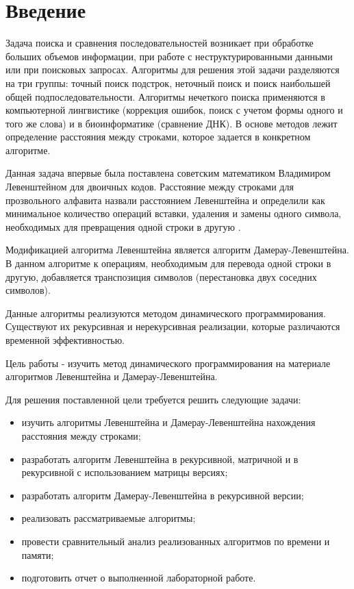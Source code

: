 \chapter*{Введение}

Задача поиска и сравнения последовательностей возникает при обработке больших объемов информации, при работе с неструктурированными данными или при поисковых запросах. Алгоритмы для решения этой задачи разделяются на три группы: точный поиск подстрок, неточный поиск и поиск наибольшей общей подпоследовательности. Алгоритмы нечеткого поиска применяются в компьютерной лингвистике (коррекция ошибок, поиск с учетом формы одного и того же слова) и в биоинформатике (сравнение ДНК). В основе методов лежит определение расстояния между строками, которое задается в конкретном алгоритме.

Данная задача впервые была поставлена советским математиком Владимиром Левенштейном для двоичных кодов. Расстояние между строками для прозвольного алфавита назвали расстоянием Левенштейна и определили как минимальное количество операций вставки, удаления и замены одного символа, необходимых для превращения одной строки в другую \cite{foxford}.

Модификацией алгоритма Левенштейна является алгоритм Дамерау-Левенштейна. В данном алгоритме к операциям, необходимым для перевода одной строки в другую, добавляется транспозиция символов (перестановка двух соседних символов).

Данные алгоритмы реализуются методом динамического программирования. Существуют их рекурсивная и нерекурсивная реализации, которые различаются временной эффективностью.

Цель работы - изучить метод динамического программирования на материале алгоритмов Левенштейна и Дамерау-Левенштейна.

Для решения поставленной цели требуется решить следующие задачи:

\begin{itemize}
	\item изучить алгоритмы Левенштейна и Дамерау-Левенштейна нахождения расстояния между строками;
	\item разработать алгоритм Левенштейна в рекурсивной, матричной и в рекурсивной с использованием матрицы версиях;
	\item разработать алгоритм Дамерау-Левенштейна в рекурсивной версии;
	\item реализовать рассматриваемые алгоритмы;
	\item провести сравнительный анализ реализованных алгоритмов по времени и памяти;
	\item подготовить отчет о выполненной лабораторной работе.
\end{itemize}